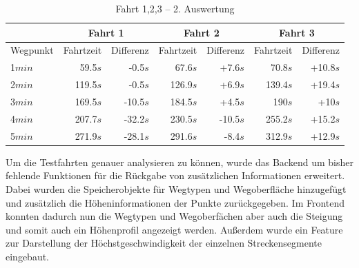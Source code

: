 \begin{table}[htb]
\centering
\caption{Fahrt 1,2,3 -- 2. Auswertung}
\label{tab:all}
\begin{tabular}{|l|r|r|r|r|r|r|}
\hhline{~|-|-|-|-|-|-}
\multicolumn{1}{l|}{} & \multicolumn{2}{c|}{Fahrt 1} & \multicolumn{2}{c|}{Fahrt 2} & \multicolumn{2}{c|}{Fahrt 3} \\ \hline
Wegpunkt              & Fahrtzeit   & Differenz     & Fahrtzeit   & Differenz     & Fahrtzeit  & Differenz      \\ \hline 
1$min$                & 59.5$s$     & -0.5$s$        & 67.6$s$     & +7.6$s$        & 70.8$s$    & +10.8$s$        \\
2$min$                & 119.5$s$    & -0.5$s$        & 126.9$s$    & +6.9$s$        & 139.4$s$   & +19.4$s$        \\
3$min$                & 169.5$s$    & -10.5$s$       & 184.5$s$    & +4.5$s$        & 190$s$     & +10$s$          \\
4$min$                & 207.7$s$    & -32.2$s$       & 230.5$s$    & -10.5$s$       & 255.2$s$   & +15.2$s$        \\
5$min$                & 271.9$s$    & -28.1$s$       & 291.6$s$    & -8.4$s$        & 312.9$s$   & +12.9$s$        \\
\hline
\end{tabular}
\end{table}


Um die Testfahrten genauer analysieren zu können, wurde das Backend um bisher fehlende Funktionen für die Rückgabe von zusätzlichen Informationen erweitert.
Dabei wurden die Speicherobjekte für Wegtypen und Wegoberfläche hinzugefügt und zusätzlich die Höheninformationen der Punkte zurückgegeben.
Im Frontend konnten dadurch nun die Wegtypen und Wegoberfächen aber auch die Steigung und somit auch ein Höhenprofil angezeigt werden.
Außerdem wurde ein Feature zur Darstellung der Höchstgeschwindigkeit der einzelnen Streckensegmente eingebaut.